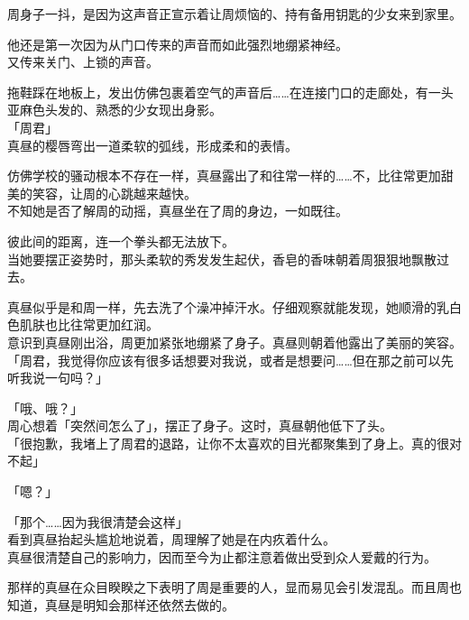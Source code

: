 周身子一抖，是因为这声音正宣示着让周烦恼的、持有备用钥匙的少女来到家里。

他还是第一次因为从门口传来的声音而如此强烈地绷紧神经。\\

又传来关门、上锁的声音。

拖鞋踩在地板上，发出仿佛包裹着空气的声音后……在连接门口的走廊处，有一头亚麻色头发的、熟悉的少女现出身影。\\

「周君」\\

真昼的樱唇弯出一道柔软的弧线，形成柔和的表情。

仿佛学校的骚动根本不存在一样，真昼露出了和往常一样的……不，比往常更加甜美的笑容，让周的心跳越来越快。\\

不知她是否了解周的动摇，真昼坐在了周的身边，一如既往。

彼此间的距离，连一个拳头都无法放下。\\

当她要摆正姿势时，那头柔软的秀发发生起伏，香皂的香味朝着周狠狠地飘散过去。

真昼似乎是和周一样，先去洗了个澡冲掉汗水。仔细观察就能发现，她顺滑的乳白色肌肤也比往常更加红润。\\

意识到真昼刚出浴，周更加紧张地绷紧了身子。真昼则朝着他露出了美丽的笑容。\\

「周君，我觉得你应该有很多话想要对我说，或者是想要问……但在那之前可以先听我说一句吗？」

「哦、哦？」\\

周心想着「突然间怎么了」，摆正了身子。这时，真昼朝他低下了头。\\

「很抱歉，我堵上了周君的退路，让你不太喜欢的目光都聚集到了身上。真的很对不起」

「嗯？」

「那个……因为我很清楚会这样」\\

看到真昼抬起头尴尬地说着，周理解了她是在内疚着什么。\\

真昼很清楚自己的影响力，因而至今为止都注意着做出受到众人爱戴的行为。

那样的真昼在众目睽睽之下表明了周是重要的人，显而易见会引发混乱。而且周也知道，真昼是明知会那样还依然去做的。\\

